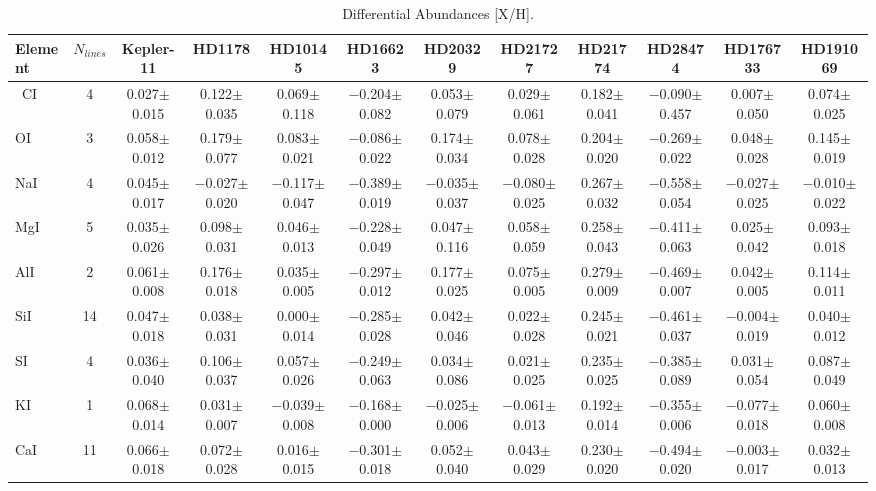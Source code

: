 \documentclass[oneside]{emulateapj}
\begin{document}
\pagebreak


\begin{table}
\caption{Differential Abundances [X/H].}
\label{tbl:abund}
\begin{tabular}{lccccccccccc} 
\hline    
\hline 
{Element} & $N_{lines}$ & Kepler-11 & HD1178 & HD10145 & HD16623 & HD20329 & HD21727 & HD21774 & HD28474 & HD176733 & HD191069 \\
\hline\
CI & 4 & 0.027$\pm$0.015 & 0.122$\pm$0.035 & 0.069$\pm$0.118 & $-$0.204$\pm$0.082 & 0.053$\pm$0.079 & 0.029$\pm$0.061 & 0.182$\pm$0.041 & $-$0.090$\pm$0.457 & 0.007$\pm$0.050 & 0.074$\pm$0.025 \\
OI & 3 & 0.058$\pm$0.012 & 0.179$\pm$0.077 & 0.083$\pm$0.021 & $-$0.086$\pm$0.022 & 0.174$\pm$0.034 & 0.078$\pm$0.028 & 0.204$\pm$0.020 & $-$0.269$\pm$0.022 & 0.048$\pm$0.028 & 0.145$\pm$0.019 \\
NaI & 4 & 0.045$\pm$0.017 & $-$0.027$\pm$0.020 & $-$0.117$\pm$0.047 & $-$0.389$\pm$0.019 & $-$0.035$\pm$0.037 & $-$0.080$\pm$0.025 & 0.267$\pm$0.032 & $-$0.558$\pm$0.054 & $-$0.027$\pm$0.025 & $-$0.010$\pm$0.022 \\
MgI & 5 & 0.035$\pm$0.026 & 0.098$\pm$0.031 & 0.046$\pm$0.013 & $-$0.228$\pm$0.049 & 0.047$\pm$0.116 & 0.058$\pm$0.059 & 0.258$\pm$0.043 & $-$0.411$\pm$0.063 & 0.025$\pm$0.042 & 0.093$\pm$0.018 \\
AlI & 2 & 0.061$\pm$0.008 & 0.176$\pm$0.018 & 0.035$\pm$0.005 & $-$0.297$\pm$0.012 & 0.177$\pm$0.025 & 0.075$\pm$0.005 & 0.279$\pm$0.009 & $-$0.469$\pm$0.007 & 0.042$\pm$0.005 & 0.114$\pm$0.011 \\
SiI & 14 & 0.047$\pm$0.018 & 0.038$\pm$0.031 & 0.000$\pm$0.014 & $-$0.285$\pm$0.028 & 0.042$\pm$0.046 & 0.022$\pm$0.028 & 0.245$\pm$0.021 & $-$0.461$\pm$0.037 & $-$0.004$\pm$0.019 & 0.040$\pm$0.012 \\
SI & 4 & 0.036$\pm$0.040 & 0.106$\pm$0.037 & 0.057$\pm$0.026 & $-$0.249$\pm$0.063 & 0.034$\pm$0.086 & 0.021$\pm$0.025 & 0.235$\pm$0.025 & $-$0.385$\pm$0.089 & 0.031$\pm$0.054 & 0.087$\pm$0.049 \\
KI & 1 & 0.068$\pm$0.014 & 0.031$\pm$0.007 & $-$0.039$\pm$0.008 & $-$0.168$\pm$0.000 & $-$0.025$\pm$0.006 & $-$0.061$\pm$0.013 & 0.192$\pm$0.014 & $-$0.355$\pm$0.006 & $-$0.077$\pm$0.018 & 0.060$\pm$0.008 \\
CaI & 11 & 0.066$\pm$0.018 & 0.072$\pm$0.028 & 0.016$\pm$0.015 & $-$0.301$\pm$0.018 & 0.052$\pm$0.040 & 0.043$\pm$0.029 & 0.230$\pm$0.020 & $-$0.494$\pm$0.020 & $-$0.003$\pm$0.017 & 0.032$\pm$0.013 \\

\end{tabular}
\end{table}
\end{document}
